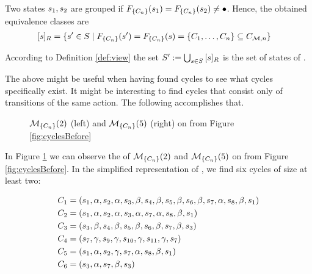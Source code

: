 \documentclass[preview]{standalone}
\begin{document}
Two states ${s}_1, {s}_2$ are grouped if ${{F_{{\{{C}_n\}}}}}({s}_1) = {{F_{{\{{C}_n\}}}}}({s}_2) \neq {\bullet}$. Hence, the obtained equivalence classes are
\begin{align*}
	\eqclassv &= \{\state' \in \states \mid \gfctexactcycle(\state') = \gfctexactcycle(\state) = \{\cycle_1, \dots, \cycle_n\} \subseteq \cycleset\}
\end{align*}

According to Definition \ref{def:view} the set ${S}' := \bigcup_{{s} \in {S}} {{[{s}]_{{R}}}}$ is the set of states of \viewexactcycle.


The \viewN above might be useful when having found cycles to see what cycles specifically exist. It might be interesting to find cycles that consist only of transitions of the same action. The following \viewN accomplishes that.

\begin{figure}[h]
	\begin{minipage}{.5\textwidth}
		
	\end{minipage}%
	\begin{minipage}{.5\textwidth}
		
	\end{minipage}
	\caption{\viewNC ${{{{{\mathcal{M}}}}_{{\{{C}_n\}}}}}(2)$ (left) and \viewN ${{{{{\mathcal{M}}}}_{{\{{C}_n\}}}}}(5)$ (right) on \chgph from Figure \ref{fig:cyclesBefore}}
	\label{fig:cycleAfterExtact}  
\end{figure}

In Figure \ref{fig:cycleAfterExtact} we can observe the \viewsN of ${{{{{\mathcal{M}}}}_{{\{{C}_n\}}}}}(2)$ and ${{{{{\mathcal{M}}}}_{{\{{C}_n\}}}}}(5)$ on \chgph from Figure \ref{fig:cyclesBefore}. In the simplified representation of \achgphN, we find six cycles of size at least two:

\begin{align*}
	{C}_1 &= ({s}_1, {\alpha}, {s}_2, {\alpha}, {s}_3, {\beta}, {s}_4, {\beta}, {s}_5, {\beta}, {s}_6, {\beta}, {s}_7, {\alpha}, {s}_8, {\beta}, {s}_1) \\
	{C}_2 &= ({s}_1, {\alpha}, {s}_2, {\alpha}, {s}_3, {\alpha}, {s}_7, {\alpha}, {s}_8, {\beta}, {s}_1) \\
	{C}_3 &= ({s}_3, {\beta}, {s}_4, {\beta}, {s}_5, {\beta}, {s}_6, {\beta}, {s}_7, {\beta}, {s}_3) \\
	{C}_4 &= ({s}_7, {\gamma}, {s}_9, {\gamma}, {s}_{10}, {\gamma}, {s}_{11}, {\gamma}, {s}_7) \\
	{C}_5 &= ({s}_1, {\alpha}, {s}_2, {\gamma}, {s}_7, {\alpha}, {s}_8, {\beta}, {s}_1) \\
	{C}_6 &= ({s}_3, {\alpha}, {s}_7, {\beta}, {s}_3)
\end{align*}
\end{document}
